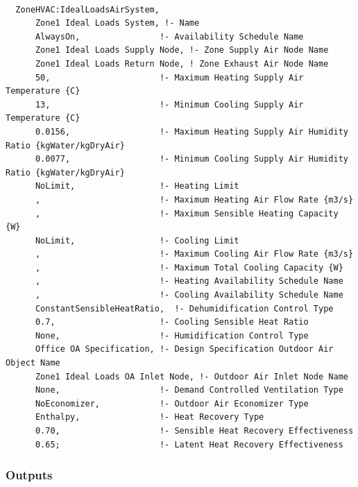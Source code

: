 \begin{lstlisting}

  ZoneHVAC:IdealLoadsAirSystem,
      Zone1 Ideal Loads System, !- Name
      AlwaysOn,                !- Availability Schedule Name
      Zone1 Ideal Loads Supply Node, !- Zone Supply Air Node Name
      Zone1 Ideal Loads Return Node, ! Zone Exhaust Air Node Name
      50,                      !- Maximum Heating Supply Air Temperature {C}
      13,                      !- Minimum Cooling Supply Air Temperature {C}
      0.0156,                  !- Maximum Heating Supply Air Humidity Ratio {kgWater/kgDryAir}
      0.0077,                  !- Minimum Cooling Supply Air Humidity Ratio {kgWater/kgDryAir}
      NoLimit,                 !- Heating Limit
      ,                        !- Maximum Heating Air Flow Rate {m3/s}
      ,                        !- Maximum Sensible Heating Capacity {W}
      NoLimit,                 !- Cooling Limit
      ,                        !- Maximum Cooling Air Flow Rate {m3/s}
      ,                        !- Maximum Total Cooling Capacity {W}
      ,                        !- Heating Availability Schedule Name
      ,                        !- Cooling Availability Schedule Name
      ConstantSensibleHeatRatio,  !- Dehumidification Control Type
      0.7,                     !- Cooling Sensible Heat Ratio
      None,                    !- Humidification Control Type
      Office OA Specification, !- Design Specification Outdoor Air Object Name
      Zone1 Ideal Loads OA Inlet Node, !- Outdoor Air Inlet Node Name
      None,                    !- Demand Controlled Ventilation Type
      NoEconomizer,            !- Outdoor Air Economizer Type
      Enthalpy,                !- Heat Recovery Type
      0.70,                    !- Sensible Heat Recovery Effectiveness
      0.65;                    !- Latent Heat Recovery Effectiveness
\end{lstlisting}

\subsubsection{Outputs}\label{outputs-043}

